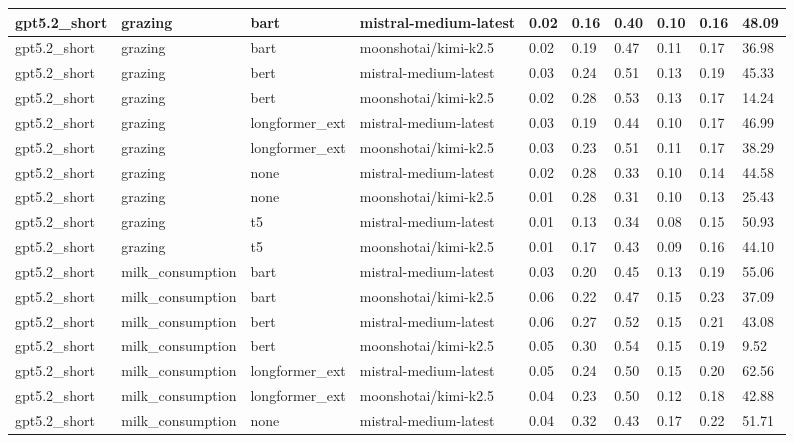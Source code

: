 \begin{tabular}{|l|l|l|l|l|l|l|l|l|l|}
 \hline
 gpt5.2\_short & grazing & bart & mistral-medium-latest & 0.02 & 0.16 & 0.40 & 0.10 & 0.16 & 48.09 \\
 \hline
 gpt5.2\_short & grazing & bart & moonshotai/kimi-k2.5 & 0.02 & 0.19 & 0.47 & 0.11 & 0.17 & 36.98 \\
 \hline
 gpt5.2\_short & grazing & bert & mistral-medium-latest & 0.03 & 0.24 & 0.51 & 0.13 & 0.19 & 45.33 \\
 \hline
 gpt5.2\_short & grazing & bert & moonshotai/kimi-k2.5 & 0.02 & 0.28 & 0.53 & 0.13 & 0.17 & 14.24 \\
 \hline
 gpt5.2\_short & grazing & longformer\_ext & mistral-medium-latest & 0.03 & 0.19 & 0.44 & 0.10 & 0.17 & 46.99 \\
 \hline
 gpt5.2\_short & grazing & longformer\_ext & moonshotai/kimi-k2.5 & 0.03 & 0.23 & 0.51 & 0.11 & 0.17 & 38.29 \\
 \hline
 gpt5.2\_short & grazing & none & mistral-medium-latest & 0.02 & 0.28 & 0.33 & 0.10 & 0.14 & 44.58 \\
 \hline
 gpt5.2\_short & grazing & none & moonshotai/kimi-k2.5 & 0.01 & 0.28 & 0.31 & 0.10 & 0.13 & 25.43 \\
 \hline
 gpt5.2\_short & grazing & t5 & mistral-medium-latest & 0.01 & 0.13 & 0.34 & 0.08 & 0.15 & 50.93 \\
 \hline
 gpt5.2\_short & grazing & t5 & moonshotai/kimi-k2.5 & 0.01 & 0.17 & 0.43 & 0.09 & 0.16 & 44.10 \\
 \hline
 gpt5.2\_short & milk\_consumption & bart & mistral-medium-latest & 0.03 & 0.20 & 0.45 & 0.13 & 0.19 & 55.06 \\
 \hline
 gpt5.2\_short & milk\_consumption & bart & moonshotai/kimi-k2.5 & 0.06 & 0.22 & 0.47 & 0.15 & 0.23 & 37.09 \\
 \hline
 gpt5.2\_short & milk\_consumption & bert & mistral-medium-latest & 0.06 & 0.27 & 0.52 & 0.15 & 0.21 & 43.08 \\
 \hline
 gpt5.2\_short & milk\_consumption & bert & moonshotai/kimi-k2.5 & 0.05 & 0.30 & 0.54 & 0.15 & 0.19 & 9.52 \\
 \hline
 gpt5.2\_short & milk\_consumption & longformer\_ext & mistral-medium-latest & 0.05 & 0.24 & 0.50 & 0.15 & 0.20 & 62.56 \\
 \hline
 gpt5.2\_short & milk\_consumption & longformer\_ext & moonshotai/kimi-k2.5 & 0.04 & 0.23 & 0.50 & 0.12 & 0.18 & 42.88 \\
 \hline
 gpt5.2\_short & milk\_consumption & none & mistral-medium-latest & 0.04 & 0.32 & 0.43 & 0.17 & 0.22 & 51.71 \\

\end{tabular}

